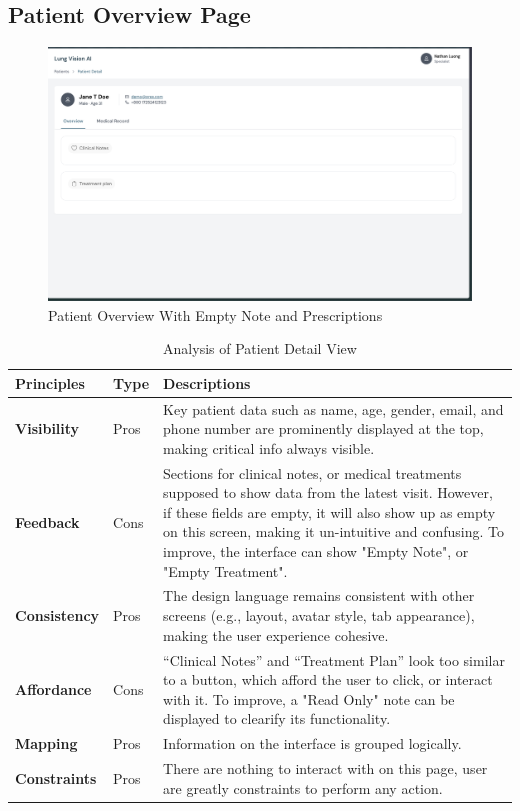 \documentclass[12pt, titlepage]{article}
\begin{document}
\newpage
\subsection{Patient Overview Page}

  \begin{figure}[ht!] 
    \centering
    \includegraphics[scale=0.25]{../../assets/patient_overview.png}
    \caption{Patient Overview With Empty Note and Prescriptions}
    \label{fig:patient_overview}
  \end{figure}

\begin{table}[h!]
    \centering
    \begin{tabular}{|p{2.5cm}|p{1.5cm}|p{11cm}|}
    \hline
    \rowcolor{gray!30}
    \textbf{Principles} & \textbf{Type} & \textbf{Descriptions} \\
    \hline
    \textbf{Visibility} & Pros & Key patient data such as name, age, gender, email, and phone number are prominently displayed at the top, making critical info always visible. \\
    \hline
    \textbf{Feedback} & Cons & Sections for clinical notes, or medical treatments supposed to show data from the latest visit. However, if these fields are empty, it will also show up as empty on this screen, making it un-intuitive and confusing. To improve,  the interface can show "Empty Note", or "Empty Treatment".\\
    \hline
    \textbf{Consistency} & Pros & The design language remains consistent with other screens (e.g., layout, avatar style, tab appearance), making the user experience cohesive. \\
    \hline
    \textbf{Affordance} & Cons & “Clinical Notes” and “Treatment Plan” look too similar to a button, which afford the user to click, or interact with it. To improve, a "Read Only" note can be displayed to clearify its functionality.\\
    \hline
    \textbf{Mapping} & Pros & Information on the interface is grouped logically. \\
    \hline
    \textbf{Constraints} & Pros & There are nothing to interact with on this page, user are greatly constraints to perform any action. \\
    \hline
    \end{tabular}
    \caption{Analysis of Patient Detail View}
\end{table}
\end{document}
